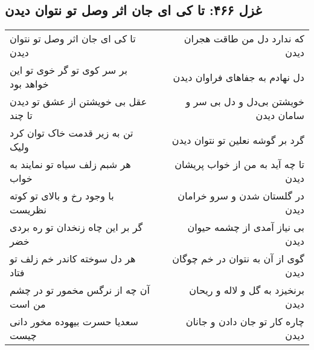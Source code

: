 \begin{center}
\section*{غزل ۴۶۶: تا کی ای جان اثر وصل تو نتوان دیدن}
\label{sec:466}
\begin{longtable}{l p{0.5cm} r}
تا کی ای جان اثر وصل تو نتوان دیدن
&&
که ندارد دل من طاقت هجران دیدن
\\
بر سر کوی تو گر خوی تو این خواهد بود
&&
دل نهادم به جفاهای فراوان دیدن
\\
عقل بی خویشتن از عشق تو دیدن تا چند
&&
خویشتن بی‌دل و دل بی سر و سامان دیدن
\\
تن به زیر قدمت خاک توان کرد ولیک
&&
گرد بر گوشه نعلین تو نتوان دیدن
\\
هر شبم زلف سیاه تو نمایند به خواب
&&
تا چه آید به من از خواب پریشان دیدن
\\
با وجود رخ و بالای تو کوته نظریست
&&
در گلستان شدن و سرو خرامان دیدن
\\
گر بر این چاه زنخدان تو ره بردی خضر
&&
بی نیاز آمدی از چشمه حیوان دیدن
\\
هر دل سوخته کاندر خم زلف تو فتاد
&&
گوی از آن به نتوان در خم چوگان دیدن
\\
آن چه از نرگس مخمور تو در چشم من است
&&
برنخیزد به گل و لاله و ریحان دیدن
\\
سعدیا حسرت بیهوده مخور دانی چیست
&&
چاره کار تو جان دادن و جانان دیدن
\\
\end{longtable}
\end{center}
